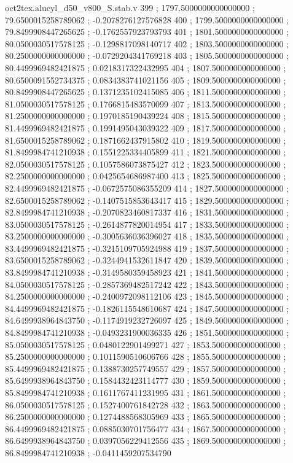 \begin{filecontents}[overwrite]{oct2tex.alucyl_d50_v800_S.stab.v}
399 ; 1797.5000000000000000 ; 79.6500015258789062 ; -0.2078276127576828
400 ; 1799.5000000000000000 ; 79.8499908447265625 ; -0.1762557923793793
401 ; 1801.5000000000000000 ; 80.0500030517578125 ; -0.1298817098140717
402 ; 1803.5000000000000000 ; 80.2500000000000000 ; -0.0729204341769218
403 ; 1805.5000000000000000 ; 80.4499969482421875 ; 0.0218317322432995
404 ; 1807.5000000000000000 ; 80.6500091552734375 ; 0.0834383741021156
405 ; 1809.5000000000000000 ; 80.8499908447265625 ; 0.1371235102415085
406 ; 1811.5000000000000000 ; 81.0500030517578125 ; 0.1766815483570099
407 ; 1813.5000000000000000 ; 81.2500000000000000 ; 0.1970185190439224
408 ; 1815.5000000000000000 ; 81.4499969482421875 ; 0.1991495043039322
409 ; 1817.5000000000000000 ; 81.6500015258789062 ; 0.1871662437915802
410 ; 1819.5000000000000000 ; 81.8499984741210938 ; 0.1551225334405899
411 ; 1821.5000000000000000 ; 82.0500030517578125 ; 0.1057586073875427
412 ; 1823.5000000000000000 ; 82.2500000000000000 ; 0.0425654686987400
413 ; 1825.5000000000000000 ; 82.4499969482421875 ; -0.0672575086355209
414 ; 1827.5000000000000000 ; 82.6500015258789062 ; -0.1407515853643417
415 ; 1829.5000000000000000 ; 82.8499984741210938 ; -0.2070823460817337
416 ; 1831.5000000000000000 ; 83.0500030517578125 ; -0.2614877820014954
417 ; 1833.5000000000000000 ; 83.2500000000000000 ; -0.3005636036396027
418 ; 1835.5000000000000000 ; 83.4499969482421875 ; -0.3215109705924988
419 ; 1837.5000000000000000 ; 83.6500015258789062 ; -0.3244941532611847
420 ; 1839.5000000000000000 ; 83.8499984741210938 ; -0.3149580359458923
421 ; 1841.5000000000000000 ; 84.0500030517578125 ; -0.2857369482517242
422 ; 1843.5000000000000000 ; 84.2500000000000000 ; -0.2400972098112106
423 ; 1845.5000000000000000 ; 84.4499969482421875 ; -0.1826115548610687
424 ; 1847.5000000000000000 ; 84.6499938964843750 ; -0.1174919232726097
425 ; 1849.5000000000000000 ; 84.8499984741210938 ; -0.0493231900036335
426 ; 1851.5000000000000000 ; 85.0500030517578125 ; 0.0480122901499271
427 ; 1853.5000000000000000 ; 85.2500000000000000 ; 0.1011590510606766
428 ; 1855.5000000000000000 ; 85.4499969482421875 ; 0.1388730257749557
429 ; 1857.5000000000000000 ; 85.6499938964843750 ; 0.1584432423114777
430 ; 1859.5000000000000000 ; 85.8499984741210938 ; 0.1611767411231995
431 ; 1861.5000000000000000 ; 86.0500030517578125 ; 0.1527400761842728
432 ; 1863.5000000000000000 ; 86.2500000000000000 ; 0.1274488568305969
433 ; 1865.5000000000000000 ; 86.4499969482421875 ; 0.0885030701756477
434 ; 1867.5000000000000000 ; 86.6499938964843750 ; 0.0397056229412556
435 ; 1869.5000000000000000 ; 86.8499984741210938 ; -0.0411459207534790

\end{filecontents}
